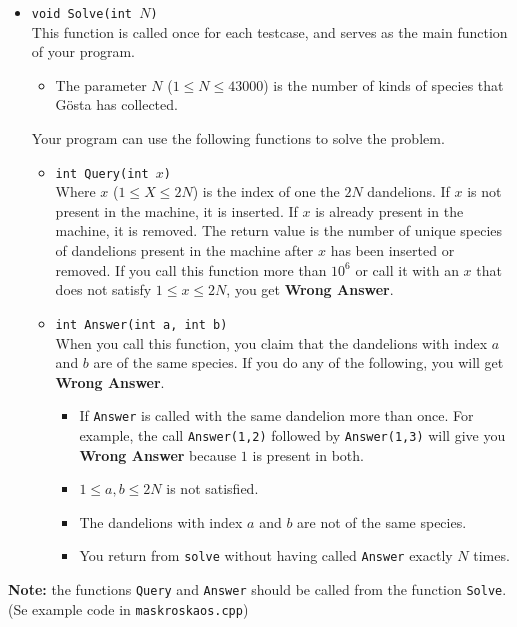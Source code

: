\begin{itemize}
  \item \texttt{void Solve(int $N$)}\\
  This function is called once for each testcase, and serves as the main function of your program.
  \begin{itemize}
    \item The parameter $N$ ($1 \leq N \leq 43000$) is the number of kinds of species that Gösta has collected.
  \end{itemize}
  Your program can use the following functions to solve the problem.
  \begin{itemize}
    \item \texttt{int Query(int $x$)}\\
    Where $x$ ($1 \leq X \leq 2N$) is the index of one the $2N$ dandelions. If $x$ is not present in the machine, it is inserted.
    If $x$ is already present in the machine, it is removed. The return value is the number of unique species of dandelions present
    in the machine after $x$ has been inserted or removed.
    If you call this function more than $10^6$ or call it with an $x$ that does not satisfy $1 \leq x \leq 2N$,
    you get \textbf{Wrong Answer}.
    \item \texttt{int Answer(int a, int b)}\\
    When you call this function, you claim that the dandelions with index $a$ and $b$ are of the same species.
    If you do any of the following, you will get \textbf{Wrong Answer}.
    \begin{itemize}
      \item If \texttt{Answer} is called with the same dandelion more than once. For example, the call \texttt{Answer(1,2)}
      followed by \texttt{Answer(1,3)} will give you \textbf{Wrong Answer} because $1$ is present in both.
      \item $1 \leq a,b \leq 2N$ is not satisfied.
      \item The dandelions with index $a$ and $b$ are not of the same species.
      \item You return from \texttt{solve} without having called \texttt{Answer} exactly $N$ times. 
    \end{itemize}
  \end{itemize}
\end{itemize}

\textbf{Note:} the functions \texttt{Query} and \texttt{Answer} should be called from the function \texttt{Solve}.
(Se example code in \texttt{maskroskaos.cpp})

